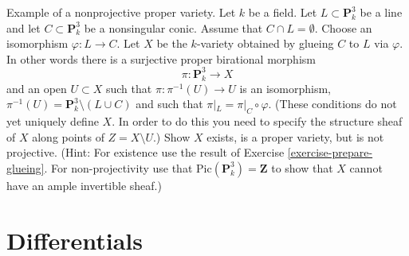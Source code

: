 \begin{exercise}
\label{exercise-nonprojective}
Example of a nonprojective proper variety.
Let $k$ be a field. Let $L \subset \mathbf{P}^3_k$ be a line and
let $C \subset \mathbf{P}^3_k$ be a nonsingular conic. Assume that
$C \cap L = \emptyset$. Choose an
isomorphism $\varphi : L \to C$. Let $X$ be the $k$-variety obtained
by glueing $C$ to $L$ via $\varphi$. In other words there is
a surjective proper birational morphism
$$
\pi : \mathbf{P}^3_k \longrightarrow X
$$
and an open $U \subset X$ such that $\pi : \pi^{-1}(U) \to U$ is
an isomorphism, $\pi^{-1}(U) = \mathbf{P}^3_k \setminus (L \cup C)$
and such that $\pi|_L = \pi|_C \circ \varphi$. (These conditions do not
yet uniquely define $X$. In order to do this you need to specify the
structure sheaf of $X$ along points of $Z = X \setminus U$.)
Show $X$ exists, is a proper variety, but is not projective.
(Hint: For existence use the result of
Exercise \ref{exercise-prepare-glueing}. For non-projectivity use that
$\text{Pic}(\mathbf{P}^3_k) = \mathbf{Z}$ to show that $X$ cannot have
an ample invertible sheaf.)
\end{exercise}



\section{Differentials}
\label{section-differentials}

